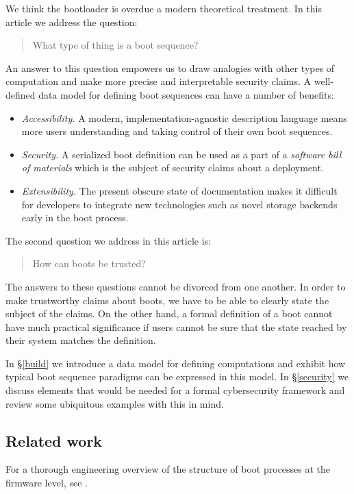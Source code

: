 We think the bootloader is overdue a modern theoretical treatment. 
%
In this article we address the question:
\begin{quote}
  What type of thing is a boot sequence?
\end{quote}
%
An answer to this question empowers us to draw analogies with other types of computation and make more precise and interpretable security claims.
%
A well-defined data model for defining boot sequences can have a number of benefits:

\begin{itemize}
\tightlist
\item
  \emph{Accessibility.} A modern, implementation-agnostic description language means more users understanding and taking control of their own boot sequences.
\item
  \emph{Security.} A serialized boot definition can be used as a part of a \emph{software bill of materials} which is the subject of security claims about a deployment.
\item
  \emph{Extensibility.} The present obscure state of documentation makes it difficult for developers to integrate new technologies such as novel storage backends early in the boot process.
\end{itemize}

The second question we address in this article is:
\begin{quote}
  How can boots be trusted?
\end{quote}

The answers to these questions cannot be divorced from one another.
%
In order to make trustworthy claims about boots, we have to be able to clearly state the subject of the claims.
%
On the other hand, a formal definition of a boot cannot have much practical significance if users cannot be sure that the state reached by their system matches the definition.

In \S\ref{build} we introduce a data model for defining computations and exhibit how typical boot sequence paradigms can be expressed in this model.
%
In \S\ref{security} we discuss elements that would be needed for a formal cybersecurity framework and review some ubiquitous examples with this in mind.


\subsection{Related work}\label{related-work}

For a thorough engineering overview of the structure of boot processes at the firmware level, see \cite{yao2020building}.

